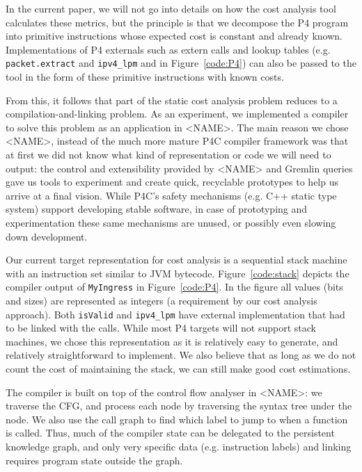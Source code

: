 \documentclass[sigconf]{acmart}
\begin{document}
  In the current paper, we will not go into details on how the cost analysis tool calculates these metrics, but the principle is that we decompose the P4 program into primitive instructions whose expected cost is constant and already known. Implementations of P4 externals such as extern calls and lookup tables (e.g. \texttt{packet.extract} and \texttt{ipv4\_lpm} and in Figure~\ref{code:P4}) can also be passed to the tool in the form of these primitive instructions with known costs. 

  From this, it follows that part of the static cost analysis problem reduces to a compilation-and-linking problem. As an experiment, we implemented a compiler to solve this problem as an application in <NAME>. The main reason we chose <NAME>, instead of the much more mature P4C compiler framework was that at first we did not know what kind of representation or code we will need to output: the control and extensibility provided by <NAME> and Gremlin queries gave us tools to experiment and create quick, recyclable prototypes to help us arrive at a final vision. While P4C's safety mechanisms (e.g. C++ static type system) support developing stable software, in case of prototyping and experimentation these same mechanisms are unused, or possibly even slowing down development.

  Our current target representation for cost analysis is a sequential stack machine with an instruction set similar to JVM bytecode. Figure~\ref{code:stack} depicts the compiler output of \texttt{MyIngress} in Figure~\ref{code:P4}. In the figure all values (bits and sizes) are represented as integers (a requirement by our cost analysis approach). Both \texttt{isValid} and \texttt{ipv4\_lpm} have external implementation that had to be linked with the calls. While most P4 targets will not support stack machines, we chose this representation as it is relatively easy to generate, and relatively straightforward to implement. We also believe that as long as we do not count the cost of maintaining the stack, we can still make good cost estimations.
  
  The compiler is built on top of the control flow analyser in <NAME>: we traverse the CFG, and process each node by traversing the syntax tree under the node. We also use the call graph to find which label to jump to when a function is called. Thus, much of the compiler state can be delegated to the persistent knowledge graph, and only very specific data (e.g. instruction labels) and linking requires program state outside the graph.  
\end{document}

